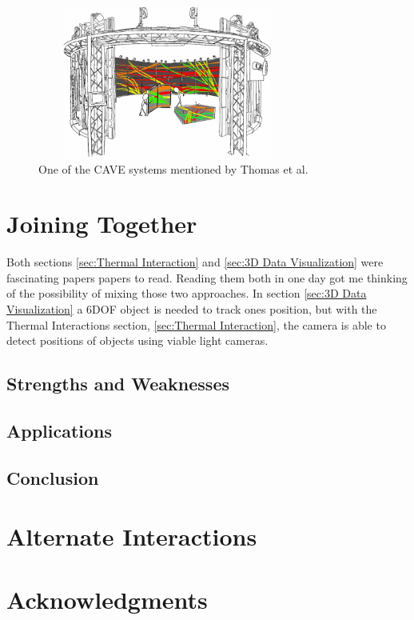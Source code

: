 \documentclass{sig-alternate}
\begin{document}
\begin{figure}
	\includegraphics[width=8.5cm, height=5cm]{Cave}
	\caption{One of the CAVE systems mentioned by Thomas et al. \cite{3D}}
	\label{fig:Cave}
\end{figure}  


\section{Joining Together}
\label{sec:Joining Together}
Both sections \ref{sec:Thermal Interaction} and \ref{sec:3D Data Visualization} were fascinating papers papers to read. Reading them both in one day got me thinking of the possibility of mixing those two approaches. In section \ref{sec:3D Data Visualization} a 6DOF object is needed to track ones position, but with the Thermal Interactions section, \ref{sec:Thermal Interaction}, the camera is able to detect positions of objects using viable light cameras.  

\subsection{Strengths and Weaknesses}
\label{Strengths and Weaknesses}

\subsection{Applications}
\label{Applications}

\subsection{Conclusion}
\label{Conclusion}

\section{Alternate Interactions}
\label{sec:Alternate Interactions}

\section{Acknowledgments}
\label{sec:Acknowledgments}



\end{document}
